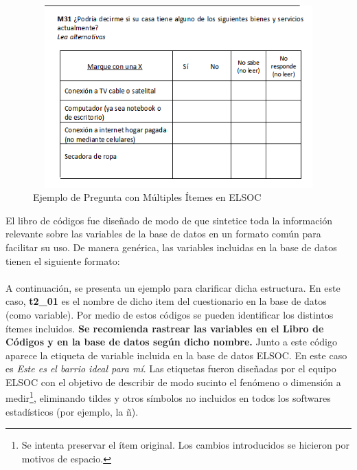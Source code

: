 \documentclass[12pt]{report}
\begin{document}
\begin{figure}[H]
	\begin{center}
	\caption{Ejemplo de Pregunta con Múltiples Ítemes en ELSOC}
	\label{fig:item}
		\includegraphics[width=15cm,height=7cm]{Figura_item}
	\end{center}
\end{figure}

El libro de códigos fue diseñado de modo de que sintetice toda la información relevante sobre las variables de la base de datos en un formato común para facilitar su uso. De manera genérica, las variables incluidas en la base de datos tienen el siguiente formato:\\


\noindent {}
\vspace{0.1cm}\\

A continuación, se presenta un ejemplo para clarificar dicha estructura. En este caso, \textbf{t2\_01} es el nombre de dicho item del cuestionario en la base de datos (como variable). Por medio de estos códigos se pueden identificar los distintos ítemes incluidos. \textbf{Se recomienda rastrear las variables en el Libro de Códigos y en la base de datos según dicho nombre.}  Junto a este código aparece la etiqueta de variable incluida en la base de datos ELSOC. En este caso es \textit{Este es el barrio ideal para mí}. Las etiquetas fueron diseñadas por el equipo ELSOC con el objetivo de describir de modo sucinto el fenómeno o dimensión a medir\footnote{Se intenta preservar el ítem original. Los cambios introducidos se hicieron por motivos de espacio.}, eliminando tildes y otros símbolos no incluidos en todos los softwares estadísticos (por ejemplo, la ñ).
\end{document}
